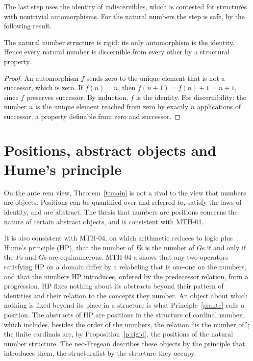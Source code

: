 \documentclass{situationist-preprint}
\begin{document}
The last step uses the identity of indiscernibles, which is contested for structures with nontrivial automorphisms. For the natural numbers the step is safe, by the following result.

\begin{proposition}\label{p:rigid}
The natural number structure is rigid: its only automorphism is the identity. Hence every natural number is discernible from every other by a structural property.
\end{proposition}

\begin{proof}
An automorphism $f$ sends zero to the unique element that is not a successor, which is zero. If $f(n) = n$, then $f(n + 1) = f(n) + 1 = n + 1$, since $f$ preserves successor. By induction, $f$ is the identity. For discernibility: the number $n$ is the unique element reached from zero by exactly $n$ applications of successor, a property definable from zero and successor.
\end{proof}

\section{Positions, abstract objects and Hume's principle}

On the ante rem view, Theorem~\ref{t:main} is not a rival to the view that numbers are objects. Positions can be quantified over and referred to, satisfy the laws of identity, and are abstract. The thesis that numbers are positions concerns the nature of certain abstract objects, and is consistent with MTH-01.

It is also consistent with MTH-04, on which arithmetic reduces to logic plus Hume's principle (HP), that the number of $F$s is the number of $G$s if and only if the $F$s and $G$s are equinumerous. MTH-04-a shows that any two operators satisfying HP on a domain differ by a relabeling that is one-one on the numbers, and that the numbers HP introduces, ordered by the predecessor relation, form a progression. HP fixes nothing about its abstracts beyond their pattern of identities and their relation to the concepts they number. An object about which nothing is fixed beyond its place in a structure is what Principle~\ref{p:ante} calls a position. The abstracts of HP are positions in the structure of cardinal number, which includes, besides the order of the numbers, the relation \enquote{is the number of}; the finite cardinals are, by Proposition~\ref{p:rigid}, the positions of the natural number structure. The neo-Fregean describes these objects by the principle that introduces them, the structuralist by the structure they occupy.
\end{document}
